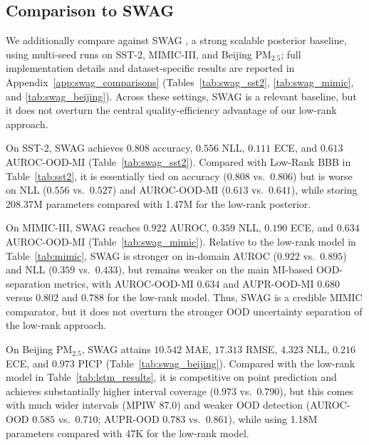 \documentclass{article}
\theoremstyle{plain}
\theoremstyle{definition}
\theoremstyle{remark}
\begin{document}
\subsection{Comparison to SWAG}
\label{sec:experiments:swag}

We additionally compare against SWAG \cite{maddox2019swag}, a strong scalable posterior baseline, using multi-seed runs on SST-2, MIMIC-III, and Beijing PM$_{2.5}$; full implementation details and dataset-specific results are reported in Appendix~\ref{app:swag_comparisons} (Tables~\ref{tab:swag_sst2}, \ref{tab:swag_mimic}, and \ref{tab:swag_beijing}). Across these settings, SWAG is a relevant baseline, but it does not overturn the central quality-efficiency advantage of our low-rank approach.

On SST-2, SWAG achieves $0.808$ accuracy, $0.556$ NLL, $0.111$ ECE, and $0.613$ AUROC-OOD-MI (Table~\ref{tab:swag_sst2}). Compared with Low-Rank BBB in Table~\ref{tab:sst2}, it is essentially tied on accuracy ($0.808$ vs.\ $0.806$) but is worse on NLL ($0.556$ vs.\ $0.527$) and AUROC-OOD-MI ($0.613$ vs.\ $0.641$), while storing 208.37M parameters compared with 1.47M for the low-rank posterior.

On MIMIC-III, SWAG reaches $0.922$ AUROC, $0.359$ NLL, $0.190$ ECE, and $0.634$ AUROC-OOD-MI (Table~\ref{tab:swag_mimic}). Relative to the low-rank model in Table~\ref{tab:mimic}, SWAG is stronger on in-domain AUROC ($0.922$ vs.\ $0.895$) and NLL ($0.359$ vs.\ $0.433$), but remains weaker on the main MI-based OOD-separation metrics, with AUROC-OOD-MI $0.634$ and AUPR-OOD-MI $0.680$ versus $0.802$ and $0.788$ for the low-rank model. Thus, SWAG is a credible MIMIC comparator, but it does not overturn the stronger OOD uncertainty separation of the low-rank approach.


On Beijing PM$_{2.5}$, SWAG attains $10.542$ MAE, $17.313$ RMSE, $4.323$ NLL, $0.216$ ECE, and $0.973$ PICP (Table~\ref{tab:swag_beijing}). Compared with the low-rank model in Table~\ref{tab:lstm_results}, it is competitive on point prediction and achieves substantially higher interval coverage ($0.973$ vs.\ $0.790$), but this comes with much wider intervals (MPIW $87.0$) and weaker OOD detection (AUROC-OOD $0.585$ vs.\ $0.710$; AUPR-OOD $0.783$ vs.\ $0.861$), while using 1.18M parameters compared with 47K for the low-rank model. 
\end{document}
